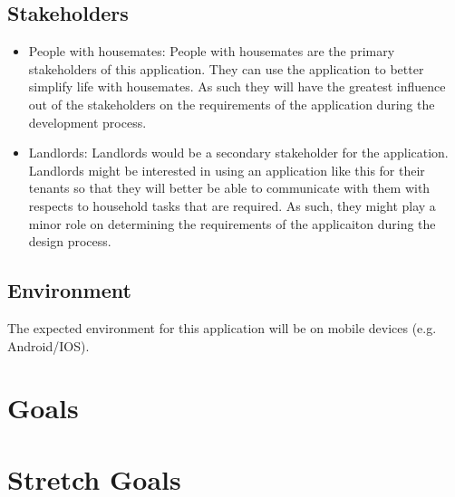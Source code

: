 \documentclass{article}
\begin{document}
\subsection{Stakeholders}

\begin{itemize}
  \item People with housemates: People with housemates are the primary stakeholders of this application. They can use the application to better simplify life with housemates. As such they will have the greatest influence out of the stakeholders on the requirements of the application during the development process.
  \item Landlords: Landlords would be a secondary stakeholder for the application. Landlords might be interested in using an application like this for their tenants so that they will better be able to communicate with them with respects to household tasks that are required. As such, they might play a minor role on determining the requirements of the applicaiton during the design process.
\end{itemize}

\subsection{Environment}

The expected environment for this application will  be on mobile devices (e.g. Android/IOS).

\section{Goals}

\section{Stretch Goals}
\end{document}
